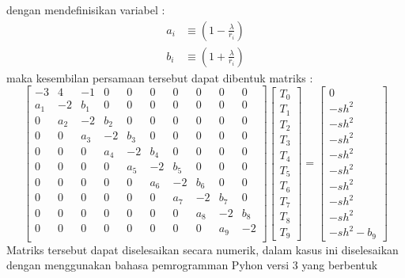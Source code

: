 \documentclass[a4paper,12pt]{article}
\numberwithin{equation}{section} %
\begin{document}
dengan mendefinisikan variabel :
\begin{align}
a_i &\equiv \left(1-\frac{\lambda}{r_i}\right) \\
b_i &\equiv \left(1+\frac{\lambda}{r_i}\right)
\end{align}
maka kesembilan persamaan tersebut dapat dibentuk matriks :
\begin{equation}
\begin{bmatrix}
-3 & 4 & -1 & 0 & 0 & 0 & 0 & 0 & 0 & 0\\ 
a_1 & -2 & b_1 & 0 & 0 & 0 & 0 & 0 & 0 & 0\\
0 & a_2 & -2 & b_2 & 0 & 0 & 0 & 0 & 0 & 0\\ 
0 & 0 & a_3 & -2 & b_3 & 0 & 0 & 0 & 0 & 0\\
0 & 0 & 0 & a_4 & -2 & b_4 & 0 & 0 & 0 & 0\\ 
0 & 0 & 0 & 0 & a_5 & -2 & b_5 & 0 & 0 & 0\\
0 & 0 & 0 & 0 & 0 & a_6 & -2 & b_6 & 0 & 0\\ 
0 & 0 & 0 & 0 & 0 & 0 & a_7 & -2 & b_7 & 0\\
0 & 0 & 0 & 0 & 0 & 0 & 0 & a_8 & -2 & b_8\\ 
0 & 0 & 0 & 0 & 0 & 0 & 0 & 0 & a_9 & -2\\
\end{bmatrix}
\begin{bmatrix}
T_0\\ T_1\\ T_2\\ T_3\\ T_4\\ T_5\\ T_6\\ T_7\\ T_8\\ T_9
\end{bmatrix}
=
\begin{bmatrix}
0 \\ -sh^2 \\ -sh^2 \\ -sh^2 \\ -sh^2 \\ -sh^2 \\ -sh^2 \\ -sh^2 \\ -sh^2 \\ -sh^2- b_9
\end{bmatrix}
\end{equation}
Matriks tersebut dapat diselesaikan secara numerik, dalam kasus ini diselesaikan dengan menggunakan bahasa pemrogramman Pyhon versi 3 yang berbentuk

\end{document}
